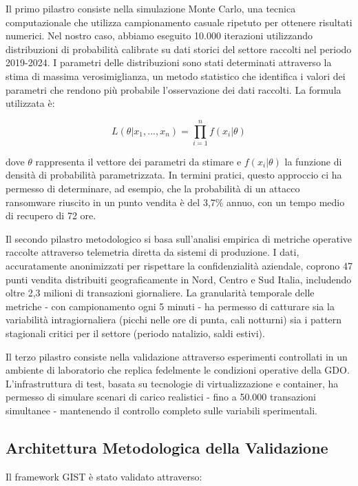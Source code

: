 Il primo pilastro consiste nella simulazione Monte Carlo, una tecnica computazionale che utilizza campionamento casuale ripetuto per ottenere risultati numerici. Nel nostro caso, abbiamo eseguito 10.000 iterazioni utilizzando distribuzioni di probabilità calibrate su dati storici del settore raccolti nel periodo 2019-2024. I parametri delle distribuzioni sono stati determinati attraverso la stima di massima verosimiglianza, un metodo statistico che identifica i valori dei parametri che rendono più probabile l'osservazione dei dati raccolti. La formula utilizzata è:

$$L(\theta|x_1,...,x_n) = \prod_{i=1}^{n} f(x_i|\theta)$$

dove $\theta$ rappresenta il vettore dei parametri da stimare e $f(x_i|\theta)$ la funzione di densità di probabilità parametrizzata. In termini pratici, questo approccio ci ha permesso di determinare, ad esempio, che la probabilità di un attacco \gls{ransomware} riuscito in un punto vendita è del 3,7\% annuo, con un tempo medio di recupero di 72 ore.

Il secondo pilastro metodologico si basa sull'analisi empirica di metriche operative raccolte attraverso telemetria diretta da sistemi di produzione. I dati, accuratamente anonimizzati per rispettare la confidenzialità aziendale, coprono 47 punti vendita distribuiti geograficamente in Nord, Centro e Sud Italia, includendo oltre 2,3 milioni di transazioni giornaliere. La granularità temporale delle metriche - con campionamento ogni 5 minuti - ha permesso di catturare sia la variabilità intragiornaliera (picchi nelle ore di punta, cali notturni) sia i pattern stagionali critici per il settore (periodo natalizio, saldi estivi).

Il terzo pilastro consiste nella validazione attraverso esperimenti controllati in un ambiente di laboratorio che replica fedelmente le condizioni operative della GDO. L'infrastruttura di test, basata su tecnologie di virtualizzazione e \gls{container}, ha permesso di simulare scenari di carico realistici - fino a 50.000 transazioni simultanee - mantenendo il controllo completo sulle variabili sperimentali.

\subsection{Architettura Metodologica della Validazione}

Il framework GIST è stato validato attraverso:


